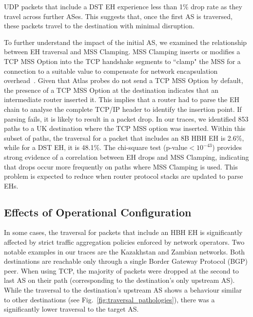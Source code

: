\documentclass[conference]{IEEEtran}
\begin{document}
UDP packets that include a DST EH experience less than 1\% drop rate as they travel across further ASes.  This
suggests that, once the first AS is traversed, these packets travel to the destination with minimal disruption.



To further understand the impact of the initial AS, we examined the
relationship between EH traversal and MSS Clamping.
MSS Clamping inserts or modifies a TCP MSS Option into the TCP handshake segments
to ``clamp" the MSS for a connection to a suitable value to compensate for
network encapsulation overhead~\cite{custura-mtu}.  
Given that Atlas probes do not send a TCP MSS Option by default, the
presence of a TCP MSS Option at the destination indicates that an intermediate
router inserted it. This implies that a router had to parse the EH chain to analyse
the complete TCP/IP header to identify the insertion point. If parsing
fails, it is likely to result in a packet drop.
In our traces, we identified 853 paths to a UK destination where the TCP
MSS option was inserted. Within
this subset of paths, the traversal for a packet that includes an 8B HBH EH is 2.6\%, while for a DST EH, it is 48.1\%. The chi-square test (p-value$<10^{-43}$) provides
strong evidence of a correlation between EH drops and MSS Clamping, indicating
that drops occur more frequently on paths where MSS Clamping is used. This problem is expected to reduce when router protocol stacks are updated to parse EHs. 

\subsection{Effects of Operational Configuration}
    \label{subsec: pathologies}

In some cases, the traversal for packets that include an HBH EH is significantly
affected by strict traffic aggregation policies enforced by network operators.
Two notable examples in our traces are the Kazakhstan and Zambian networks.
Both destinations are reachable only through a single Border Gateway Protocol (BGP) peer. When using TCP, the majority of packets were dropped at the
second to last AS on their path (corresponding to the destination's only upstream AS).
While the traversal to the destination's upstream AS shows a behaviour
similar to other destinations (see Fig.~\ref{fig:traversal_pathologies}),
there was a significantly lower traversal to the target AS.
\end{document}
